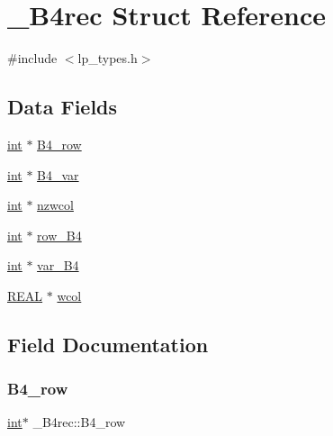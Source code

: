 \hypertarget{struct___b4rec}{}\section{\+\_\+\+B4rec Struct Reference}
\label{struct___b4rec}


{\ttfamily \#include $<$lp\+\_\+types.\+h$>$}

\subsection*{Data Fields}
\begin{DoxyCompactItemize}
\item 
\hyperlink{lp__lib_8h_adeb9ec6400320e4923ac9d836d509ddb}{int} $\ast$ \hyperlink{struct___b4rec_aa48f4e633922051aa93c1460ad461153}{B4\+\_\+row}
\item 
\hyperlink{lp__lib_8h_adeb9ec6400320e4923ac9d836d509ddb}{int} $\ast$ \hyperlink{struct___b4rec_a0ea8dd53fac4fefdc0db82d13183bfd7}{B4\+\_\+var}
\item 
\hyperlink{lp__lib_8h_adeb9ec6400320e4923ac9d836d509ddb}{int} $\ast$ \hyperlink{struct___b4rec_ad864a0e72ad964a2b52f8e7c93194bb3}{nzwcol}
\item 
\hyperlink{lp__lib_8h_adeb9ec6400320e4923ac9d836d509ddb}{int} $\ast$ \hyperlink{struct___b4rec_ad8ee6a30115a9dc5c85996d45b0fc060}{row\+\_\+\+B4}
\item 
\hyperlink{lp__lib_8h_adeb9ec6400320e4923ac9d836d509ddb}{int} $\ast$ \hyperlink{struct___b4rec_ac41c6d593799fe8e2a26d8be4f3dac0e}{var\+\_\+\+B4}
\item 
\hyperlink{lp__lib_8h_a92bd5e363d131fa73669358edb232dce}{R\+E\+AL} $\ast$ \hyperlink{struct___b4rec_a3d99e0897c55078de6912d570528c44b}{wcol}
\end{DoxyCompactItemize}


\subsection{Field Documentation}
\mbox{\label{struct___b4rec_aa48f4e633922051aa93c1460ad461153}} 
\subsubsection{\texorpdfstring{B4\+\_\+row}{B4\_row}}
{\footnotesize\ttfamily \hyperlink{lp__lib_8h_adeb9ec6400320e4923ac9d836d509ddb}{int}$\ast$ \+\_\+\+B4rec\+::\+B4\+\_\+row}

